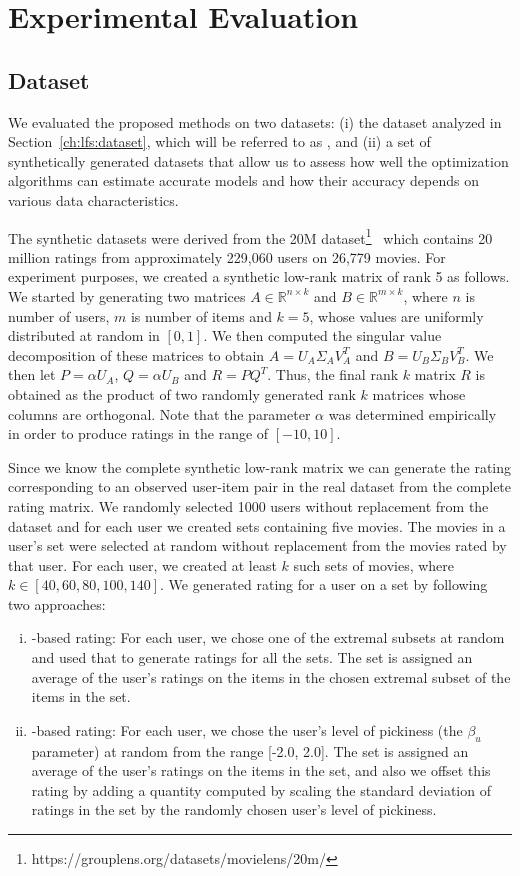 \section{Experimental Evaluation} \label{ch:lfs:exp_eval}
\subsection{Dataset}\label{ch:lfs:evaldata}
We evaluated the proposed methods on two datasets: (i) the dataset analyzed in
Section~\ref{ch:lfs:dataset}, which will be referred to as \MLREALSETS, and (ii) a set
of synthetically generated datasets that
allow us to assess how well
the optimization algorithms can estimate accurate models and how their
accuracy depends on various data characteristics.

The synthetic datasets were derived from the \ML
20M
dataset\footnote{https://grouplens.org/datasets/movielens/20m/}~\cite{harper2016movielens}  which
contains 20 million ratings from approximately 229,060 users on 26,779 movies.
For experiment purposes, we
created a synthetic low-rank matrix of rank 5 as follows. 
%
We started by generating two matrices
$A\in\mathbb{R}^{n\times k}$ and $B\in\mathbb{R}^{m\times k}$, where $n$ is
number of users, $m$ is number of items and $k = 5$, whose values are
uniformly distributed at random in $[0, 1]$. We then computed the singular value
decomposition of these matrices to obtain $A=U_A\Sigma_A V_A^T$ and $B=U_B\Sigma_B
V_B^T$. We then let $P=\alpha U_A$, $Q=\alpha U_B$ and $R = PQ^T$. Thus, the final
rank $k$ matrix $R$ is obtained as the product of two randomly generated rank $k$
matrices whose columns are orthogonal. Note that the parameter $\alpha$ was
determined empirically in order to produce ratings in the range of $[-10, 10]$.

Since we know the complete synthetic low-rank matrix we can generate the rating
corresponding to an observed user-item pair in the real dataset from the complete
rating matrix.
We randomly selected 1000 users without replacement from the dataset and for
each user we created sets containing five movies. 
The movies in a user's set
were selected at random without replacement from the movies rated by that user.
For each user, we created at least $k$ such sets of movies, where $k \in [40,
60, 80, 100, 140]$.
We generated rating for a user on a set by 
following two approaches: 
\begin{enumerate}[(i)]  
  \item \ES-based rating: For each user, we chose one of the
extremal subsets at random and used that to generate ratings for all the sets.
The set is assigned an average of the user's ratings on the items in the
chosen extremal subset of the items in the set. 

  \item  \VO-based rating: For each user, 
we chose the user's level of pickiness (the $\beta_u$ parameter) at random from the
range [-2.0, 2.0]. The set is assigned an average of the user's ratings on the items in the set,
and also we offset this rating by adding a quantity computed by scaling the
standard deviation of ratings in the set by the randomly chosen user's level of
pickiness.
\end{enumerate}

